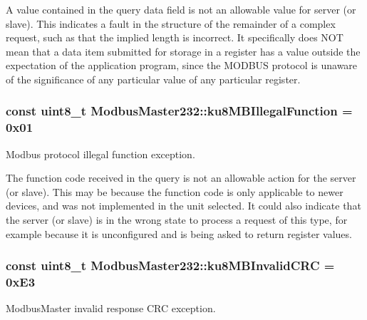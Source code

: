 A value contained in the query data field is not an allowable value for server (or slave). This indicates a fault in the structure of the remainder of a complex request, such as that the implied length is incorrect. It specifically does N\+OT mean that a data item submitted for storage in a register has a value outside the expectation of the application program, since the M\+O\+D\+B\+US protocol is unaware of the significance of any particular value of any particular register. 
\subsubsection[{\texorpdfstring{ku8\+M\+B\+Illegal\+Function}{ku8MBIllegalFunction}}]{\setlength{\rightskip}{0pt plus 5cm}const uint8\+\_\+t Modbus\+Master232\+::ku8\+M\+B\+Illegal\+Function = 0x01\hspace{0.3cm}{\ttfamily [static]}}\hypertarget{class_modbus_master232_a4cce540f90b010767157b4c02ec7b67e}{}\label{class_modbus_master232_a4cce540f90b010767157b4c02ec7b67e}
Modbus protocol illegal function exception.

The function code received in the query is not an allowable action for the server (or slave). This may be because the function code is only applicable to newer devices, and was not implemented in the unit selected. It could also indicate that the server (or slave) is in the wrong state to process a request of this type, for example because it is unconfigured and is being asked to return register values. 
\subsubsection[{\texorpdfstring{ku8\+M\+B\+Invalid\+C\+RC}{ku8MBInvalidCRC}}]{\setlength{\rightskip}{0pt plus 5cm}const uint8\+\_\+t Modbus\+Master232\+::ku8\+M\+B\+Invalid\+C\+RC = 0x\+E3\hspace{0.3cm}{\ttfamily [static]}}\hypertarget{class_modbus_master232_aa390e0eb3db73565735fb2857930486f}{}\label{class_modbus_master232_aa390e0eb3db73565735fb2857930486f}
Modbus\+Master invalid response C\+RC exception.

